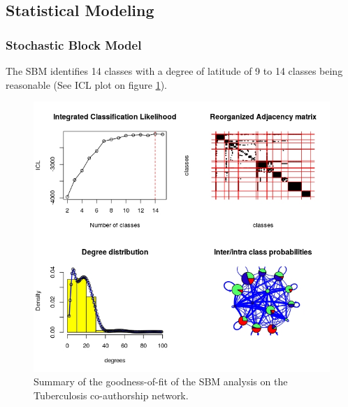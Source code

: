 \subsection{Statistical Modeling}

\subsubsection{Stochastic Block Model}
\label{sec:tb_results_sbm}
The SBM identifies 14 classes with a degree of latitude of 9 to 14 classes being reasonable (See ICL plot on figure \ref{fig:tb_sbmgof}).

\begin{figure}[h!]
\centering
\hspace*{-1cm}
\includegraphics[scale=0.85]{Chapters/tb/statMod/tb_sbm}
\caption{Summary of the goodness-of-fit of the SBM analysis on the Tuberculosis co-authorship network.}
\label{fig:tb_sbmgof}
\end{figure}

